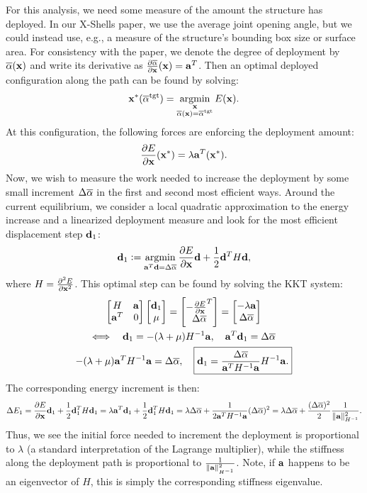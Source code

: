 \documentclass[10pt]{article}
\begin{document}
For this analysis, we need some measure of the amount the structure has deployed.
In our X-Shells paper, we use the average joint opening angle,
but we could instead use, e.g., a measure of the structure's bounding box size or
surface area. For consistency with the paper, we denote the degree of deployment
by $\overline{\alpha}({\bf x})$ and write its derivative as $\frac{\partial \overline{\alpha}}{\partial {\bf x}}({\bf x}) = {\bf a}^T$.
Then an optimal deployed configuration along the path can be found by solving:
$$
{\bf x}^*(\overline{\alpha}^\text{tgt}) = \operatorname*{argmin}_{\substack{{\bf x} \\ \overline{\alpha}({\bf x}) = \overline{\alpha}^\text{tgt}}} E({\bf x}).
$$
At this configuration, the following forces are enforcing the
deployment amount:
$$
\frac{\partial E}{\partial {\bf x}}({\bf x}^*) = \lambda {\bf a}^T({\bf x}^*).
$$
Now, we wish to measure the work needed to increase the deployment by some
small increment $\Delta \overline{\alpha}$ in the first and second most efficient
ways. Around the current equilibrium, we consider a local quadratic
approximation to the energy increase and a linearized deployment measure and
look for the most efficient displacement step ${\bf d}_1$:
$$
{\bf d}_1 \vcentcolon= \operatorname*{argmin}_{{\bf a}^T {\bf d} = \Delta \overline{\alpha}} \frac{\partial E}{\partial {\bf x}} {\bf d} + \frac{1}{2} {\bf d}^T H {\bf d},
$$
where $H = \frac{\partial^2 E}{\partial {\bf x}^2 }$.
This optimal step can be found by solving the KKT system:
\begin{gather*}
\begin{bmatrix}
    H & {\bf a} \\
    {\bf a}^T & 0
\end{bmatrix}
\begin{bmatrix}
    {\bf d}_1 \\ \mu
\end{bmatrix}
=
\begin{bmatrix}
    -\frac{\partial E}{\partial {\bf x}}^T \\ \Delta \overline{\alpha}
\end{bmatrix}
= 
\begin{bmatrix}
    -\lambda {\bf a} \\ \Delta \overline{\alpha}
\end{bmatrix}
\\
\Longleftrightarrow \quad 
    {\bf d}_1 = -(\lambda + \mu)H^{-1} {\bf a}, \quad {\bf a}^T {\bf d}_1 = \Delta \overline{\alpha}
\\
    -(\lambda + \mu){\bf a}^T H^{-1} {\bf a} = \Delta \overline{\alpha}, \quad
\boxed{
    {\bf d}_1 = \frac{\Delta \overline{\alpha}}{{\bf a}^T H^{-1} {\bf a}} H^{-1} {\bf a}.
}
\end{gather*}
The corresponding energy increment is then:
$$
\Delta E_1 =
\frac{\partial E}{\partial {\bf x}} {\bf d}_1 + \frac{1}{2} {\bf d}_1^T H {\bf d}_1
= \lambda {\bf a}^T {\bf d}_1 + \frac{1}{2} {\bf d}_1^T H {\bf d}_1
= \lambda \Delta \overline{\alpha} + \frac{1}{2 {\bf a}^T H^{-1} {\bf a}}(\Delta \overline{\alpha})^2
= \lambda \Delta \overline{\alpha} + \frac{(\Delta \overline{\alpha})^2}{2} \frac{1}{\lVert{\bf a}\rVert_{H^{-1}}^2}.
$$
Thus, we see the initial force needed to increment the deployment is proportional to $\lambda$
(a standard interpretation of the Lagrange multiplier), while the stiffness along the
deployment path is proportional to $\frac{1}{\lVert{\bf a}\rVert_{H^{-1}}^2}$. Note, if ${\bf a}$
happens to be an eigenvector of $H$, this is simply the corresponding stiffness eigenvalue.
\end{document}
